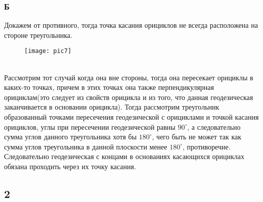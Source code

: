 		\subsubsection*{\textbf{Б}}
		Докажем от противного, тогда точка касания орициклов не всегда расположена на стороне треугольника.\\
		\begin{figure}[h]
			\texttt{[image: pic7]}
		\end{figure}\\
		\noindent
		Рассмотрим тот случай когда она вне стороны, тогда она пересекает орициклы в каких-то точках, причем в этих точках она также перпендикулярная орициклам(это следует из свойств орицикла и из того, что данная геодезическая заканчивается в основании орицикла). Тогда рассмотрим треугольник образованный точками пересечения геодезической с орициклами и точкой касания орициклов, углы при пересечении геодезической равны $90^{\circ}$, а следовательно сумма углов данного треугольника хотя бы $180^{\circ}$, чего быть не может так как сумма углов треугольника в данной плоскости менее $180^{\circ}$, противоречие. \\
		Следовательно геодезическая с концами в основаниях касающихся орициклах обязана проходить через их точку касания.
		
		
		
		\subsection*{2}
